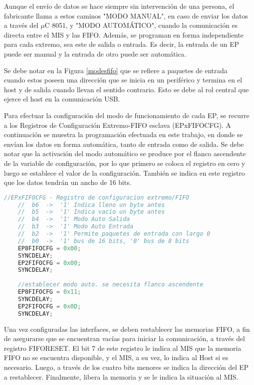 	Aunque el envío de datos se hace siempre sin intervención de una persona, el fabricante llama a estos caminos "MODO MANUAL", en caso de enviar los datos a través del $\mu$C 8051, y "MODO AUTOMÁTICO", cuando la comunicación es directa entre el MIS y las FIFO. Además, se programan en forma independiente para cada extremo, sea este de salida o entrada. Es decir, la entrada de un EP puede ser manual y la entrada de otro puede ser automática.%
	
	Se debe notar en la Figura \ref{modesfifo} que se refiere a paquetes de entrada cuando estos poseen una dirección que se inicia en un periférico y termina en el host y de salida cuando llevan el sentido contrario. Esto se debe al rol central que ejerce el host en la comunicación USB.
	
	Para efectuar la configuración del modo de funcionamiento de cada EP, se recurre a los Registros de Configuración Extremo-FIFO esclava (EPxFIFOCFG). A continuación se muestra la programación efectuada en este trabajo, en donde se envían los datos en forma automática, tanto de entrada como de salida. Se debe notar que la activación del modo automático se produce por el flanco ascendente de la variable de configuración, por lo que primero se coloca el registro en cero y luego se establece el valor de la configuración. También se indica en este registro que los datos tendrán un ancho de 16 bits.
	
	\begin{lstlisting}[language=C,backgroundcolor=\color{gray!30}]
	//EPxFIFOCFG - Registro de configuracion extremo/FIFO
	//	b6	->	'1' Indica lleno un byte antes
	//	b5	->	'1' Indica vacío un byte antes
	//	b4	->	'1' Modo Auto Salida
	//	b3	->	'1' Modo Auto Entrada
	//	b2	->	'1' Permite paquetes de entrada con largo 0
	//	b0	->	'1' bus de 16 bits, '0' bus de 8 bits
	EP8FIFOCFG = 0x00;
	SYNCDELAY;
	EP2FIFOCFG = 0x00;
	SYNCDELAY;
	
	//establecer modo auto. se necesita flanco ascendente
	EP8FIFOCFG = 0x11;
	SYNCDELAY;
	EP2FIFOCFG = 0x0D;
	SYNCDELAY;
	\end{lstlisting}
	
	Una vez configuradas las interfaces, se deben restablecer las memorias FIFO, a fin de asegurarse que se encuentran vacías para iniciar la comunicación, a través del registro FIFORESET. El bit 7 de este registro le indica al MIS que la memoria FIFO no se encuentra disponible, y el MIS, a su vez, lo indica al Host si es necesario. Luego, a través de los cuatro bits menores se indica la dirección del EP a restablecer. Finalmente, libera la memoria y se le indica la situación al MIS.
	
